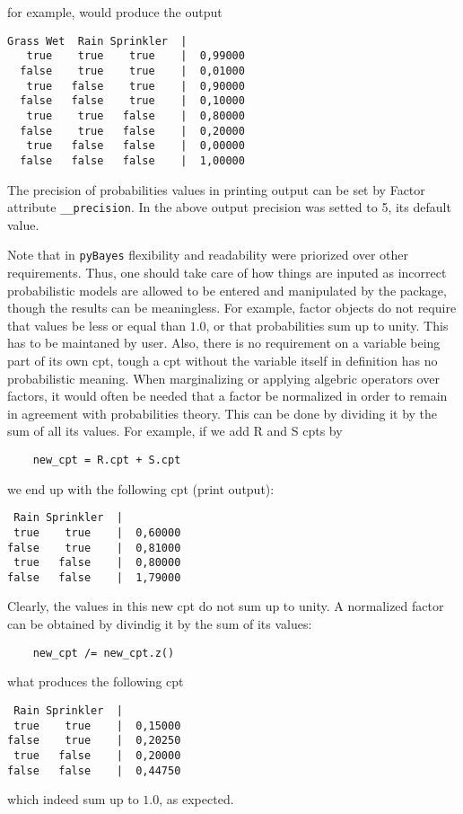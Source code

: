 \documentclass[10pt,a4paper]{report}
\begin{document}
for example, would produce the output

\begin{verbatim}
Grass Wet  Rain Sprinkler  |
   true    true    true    |  0,99000
  false    true    true    |  0,01000
   true   false    true    |  0,90000
  false   false    true    |  0,10000
   true    true   false    |  0,80000
  false    true   false    |  0,20000
   true   false   false    |  0,00000
  false   false   false    |  1,00000
\end{verbatim}

The precision of probabilities values in printing output can be set by Factor attribute \verb|__precision|. In the above output precision was setted to 5, its default value.

Note that in \verb|pyBayes| flexibility and readability were priorized over other requirements. Thus, one should take care of how things are inputed as incorrect probabilistic models are allowed to be entered and manipulated by the package, though the results can be meaningless. For example, factor objects do not require that values be less or equal than $1.0$, or that probabilities sum up to unity. This has to be maintaned by user. Also, there is no requirement on a variable being part of its own cpt, tough a cpt without the variable itself in definition has no probabilistic meaning. When marginalizing or applying algebric operators over factors, it would often be needed that a factor be normalized in order to remain in agreement with probabilities theory. This can be done by dividing it by the sum of all its values. For example, if we add R and S cpts by 
\begin{verbatim}
	new_cpt = R.cpt + S.cpt
\end{verbatim}
we end up with the following cpt (print output):
\begin{verbatim}
 Rain Sprinkler  |
 true    true    |  0,60000
false    true    |  0,81000
 true   false    |  0,80000
false   false    |  1,79000
\end{verbatim}

Clearly, the values in this new cpt do not sum up to unity. A normalized factor can be obtained by divindig it by the sum of its values:
\begin{verbatim}
	new_cpt /= new_cpt.z()
\end{verbatim}
what produces the following cpt
\begin{verbatim}
 Rain Sprinkler  |
 true    true    |  0,15000
false    true    |  0,20250
 true   false    |  0,20000
false   false    |  0,44750
\end{verbatim}
which indeed sum up to $1.0$, as expected.
\end{document}
